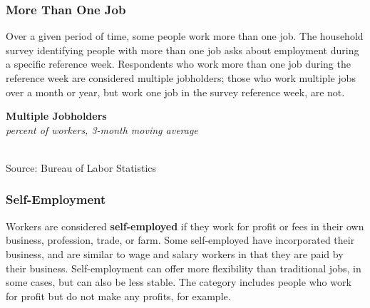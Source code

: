 \documentclass{report}
\makeatletter
\newcommand{\tbllink}[1]{\href{https://raw.githubusercontent.com/bdecon/US-chartbook/master/chartbook/data/#1}{\faTable}}
\newcommand*\short[1]{\expandafter\@gobbletwo\number\numexpr#1\relax}
\newcommand{\shdateaxisticks}{
		date coordinates in=x, axis line style={draw=none},
		xmax={2023-10-01},
		max space between ticks=40,	    
		xtick={{1990-01-01}, {1995-01-01}, {2000-01-01}, 
			{2005-01-01}, {2010-01-01}, {2015-01-01}, {2020-01-01}},
		minor xtick={},
		enlarge y limits={0.06}, enlarge x limits={0.01},
		}
\newcommand{\stdline}[4]{\addplot[very thick, no markers, color=#1] 
		table [x=#2, y=#3, col sep=comma] {#4};	}
\newcommand{\rebars}{
		\fill[color=black!10] (axis cs:{2007-12-01},\pgfkeysvalueof{/pgfplots/ymin}) rectangle 
			(axis cs:{2009-07-01}, \pgfkeysvalueof{/pgfplots/ymax});
		\fill[color=black!10] (axis cs:{2001-03-01},\pgfkeysvalueof{/pgfplots/ymin}) rectangle 
			(axis cs:{2001-11-01}, \pgfkeysvalueof{/pgfplots/ymax});
		\fill[color=black!10] (axis cs:{2020-02-01},\pgfkeysvalueof{/pgfplots/ymin}) rectangle 
			(axis cs:{2020-05-01}, \pgfkeysvalueof{/pgfplots/ymax});}
\makeatother
\begin{document}
{\begin{minipage}{0.76\textwidth}
\subsubsection*{More Than One Job}
\small Over a given period of time, some people work more than one job. The household survey identifying people with more than one job asks about employment during a specific reference week. Respondents who work more than one job during the reference week are considered multiple jobholders; those who work multiple jobs over a month or year, but work one job in the survey reference week, are not. 
\vspace{0.5mm}

\begin{minipage}{0.55\textwidth}
\normalsize \textbf{Multiple Jobholders}\\
\footnotesize{\textit{percent of workers, 3-month moving average}}\\
\hspace*{-2mm} \\
\footnotesize{Source: Bureau of Labor Statistics} \hfill \tbllink{mjh.csv} \ \
\end{minipage} \hfill
\begin{minipage}{0.395\textwidth}
\small 
\end{minipage}
\end{minipage}
\newpage
\begin{minipage}{0.76\textwidth}
\subsubsection*{Self-Employment}
\small Workers are considered \textbf{self-employed} if they work for profit or fees in their own business, profession, trade, or farm. Some self-employed have incorporated their business, and are similar to wage and salary workers in that they are paid by their business. Self-employment can offer more flexibility than traditional jobs, in some cases, but can also be less stable. The category includes people who work for profit but do not make any profits, for example. 


\end{minipage}}
\end{document}
